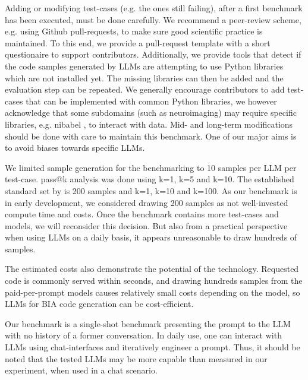 \documentclass{ecai}
\begin{document}
Adding or modifying test-cases (e.g. the ones still failing), after a first benchmark has been executed, must be done carefully. We recommend a peer-review scheme, e.g. using Github pull-requests, to make sure good scientific practice is maintained. To this end, we provide a pull-request template with a short questionaire to support contributors. Additionally, we provide tools that detect if the code samples generated by LLMs are attempting to use Python libraries which are not installed yet. The missing libraries can then be added and the evaluation step can be repeated. We generally encourage contributors to add test-cases that can be implemented with common Python libraries, we however acknowledge that some subdomains (such as neuroimaging) may require specific libraries, e.g. nibabel \citep{brett_2024_10714563}, to interact with data. Mid- and long-term modifications should be done with care to maintain this benchmark. One of our major aims is to avoid biases towards specific LLMs.

We limited sample generation for the benchmarking to 10 samples per LLM per test-case. pass@k analysis was done using k=1, k=5 and k=10. The established standard set by \citep{chen2021evaluating} is 200 samples and k=1, k=10 and k=100. As our benchmark is in early development, we considered drawing 200 samples as not well-invested compute time and costs. Once the benchmark contains more test-cases and models, we will reconsider this decision. But also from a practical perspective when using LLMs on a daily basis, it appears unreasonable to draw hundreds of samples.

The estimated costs also demonstrate the potential of the technology. Requested code is commonly served within seconds, and drawing hundreds samples from the paid-per-prompt models causes relatively small costs depending on the model, so LLMs for BIA code generation can be cost-efficient.

Our benchmark is a single-shot benchmark presenting the prompt to the LLM with no history of a former conversation. In daily use, one can interact with LLMs using chat-interfaces and iteratively engineer a prompt. Thus, it should be noted that the tested LLMs may be more capable than measured in our experiment, when used in a chat scenario.
\end{document}
